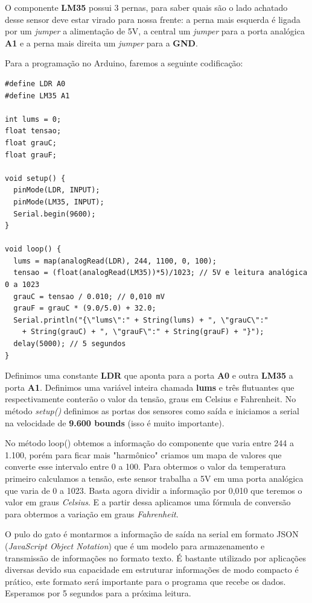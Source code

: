 \documentclass[a4paper,11pt]{article}
\begin{document}
O componente \textbf{LM35} possui 3 pernas, para saber quais são o lado achatado desse sensor deve estar virado para nossa frente: a perna mais esquerda é ligada por um \textit{jumper} a alimentação de 5V, a central um \textit{jumper} para a porta analógica \textbf{A1} e a perna mais direita um \textit{jumper} para a \textbf{GND}.

Para a programação no Arduino, faremos a seguinte codificação:
\begin{lstlisting}[]
#define LDR A0
#define LM35 A1

int lums = 0;
float tensao;
float grauC;
float grauF;

void setup() {
  pinMode(LDR, INPUT);
  pinMode(LM35, INPUT);
  Serial.begin(9600);
}

void loop() {
  lums = map(analogRead(LDR), 244, 1100, 0, 100);
  tensao = (float(analogRead(LM35))*5)/1023; // 5V e leitura analógica 0 a 1023
  grauC = tensao / 0.010; // 0,010 mV
  grauF = grauC * (9.0/5.0) + 32.0;
  Serial.println("{\"lums\":" + String(lums) + ", \"grauC\":" 
  	+ String(grauC) + ", \"grauF\":" + String(grauF) + "}"); 
  delay(5000); // 5 segundos
}
\end{lstlisting}

Definimos uma constante \textbf{LDR} que aponta para a porta \textbf{A0} e outra \textbf{LM35} a porta \textbf{A1}. Definimos uma variável inteira chamada \textbf{lums} e três flutuantes que respectivamente conterão o valor da tensão, graus em Celsius e Fahrenheit. No método \textit{setup()} definimos as portas dos sensores como saída e iniciamos a serial na velocidade de \textbf{9.600 bounds} (isso é muito importante).

No método loop() obtemos a informação do componente que varia entre 244 a 1.100, porém para ficar mais "harmônico" criamos um mapa de valores que converte esse intervalo entre 0 a 100. Para obtermos o valor da temperatura primeiro calculamos a tensão, este sensor trabalha a 5V em uma porta analógica que varia de 0 a 1023. Basta agora dividir a informação por 0,010 que teremos o valor em graus \textit{Celsius}. E a partir dessa aplicamos uma fórmula de conversão para obtermos a variação em graus \textit{Fahrenheit}.

O pulo do gato é montarmos a informação de saída na serial em formato JSON (\textit{JavaScript Object Notation}) que é um modelo para armazenamento e transmissão de informações no formato texto. É bastante utilizado por aplicações diversas devido sua capacidade em estruturar informações de modo compacto é prático, este formato será importante para o programa que recebe os dados. Esperamos por 5 segundos para a próxima leitura.
\end{document}

